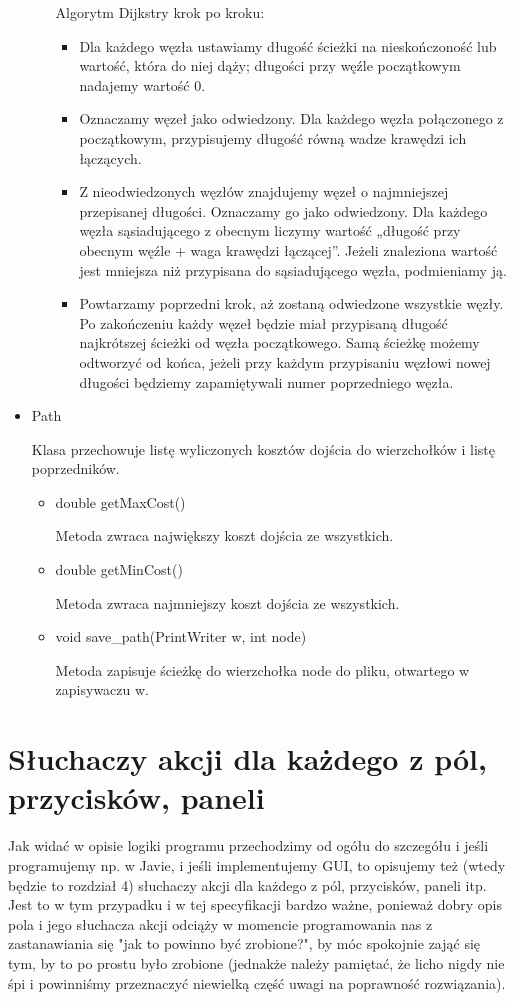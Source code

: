 \documentclass[]{article}
\begin{document}
\begin{itemize}
\begin{itemize}
        Algorytm Dijkstry krok po kroku:
        \begin{itemize}
            \item Dla każdego węzła ustawiamy długość ścieżki na nieskończoność lub wartość, która do niej dąży; długości przy węźle początkowym nadajemy wartość 0. 
            \item Oznaczamy węzeł jako odwiedzony. Dla każdego węzła połączonego z początkowym, przypisujemy długość równą wadze krawędzi ich łączących.
            \item Z nieodwiedzonych węzłów znajdujemy węzeł o najmniejszej przepisanej długości. Oznaczamy go jako odwiedzony. Dla każdego węzła sąsiadującego z obecnym liczymy wartość „długość przy obecnym węźle + waga krawędzi łączącej”. Jeżeli znaleziona wartość jest mniejsza niż przypisana do sąsiadującego węzła, podmieniamy ją.
            \item Powtarzamy poprzedni krok, aż zostaną odwiedzone wszystkie węzły. Po zakończeniu każdy węzeł będzie miał przypisaną długość najkrótszej ścieżki od węzła początkowego. Samą ścieżkę możemy odtworzyć od końca, jeżeli przy każdym przypisaniu węzłowi nowej długości będziemy zapamiętywali numer poprzedniego węzła.
        \end{itemize}
    \end{itemize}
    \item Path
  
    Klasa przechowuje listę wyliczonych kosztów dojścia do wierzchołków i listę poprzedników.
        \begin{itemize}
        \item double getMaxCost()
        
        Metoda zwraca największy koszt dojścia ze wszystkich.
        \item double getMinCost()
        
        Metoda zwraca najmniejszy koszt dojścia ze wszystkich.
        \item void save\_path(PrintWriter w, int node)
        
        Metoda zapisuje ścieżkę do wierzchołka node do pliku, otwartego w zapisywaczu w.
    \end{itemize}
\end{itemize}

\section{Słuchaczy akcji dla każdego z pól, przycisków, paneli}\label{header-n279}
 Jak widać w opisie logiki programu przechodzimy od ogółu do szczegółu i jeśli programujemy np. w Javie, i jeśli implementujemy GUI, to opisujemy też (wtedy będzie to rozdział 4) słuchaczy akcji dla każdego z pól, przycisków, paneli itp. Jest to w tym przypadku i w tej specyfikacji bardzo ważne, ponieważ dobry opis pola i jego słuchacza akcji odciąży w momencie programowania nas z zastanawiania się "jak to powinno być zrobione?", by móc spokojnie zająć się tym, by to po prostu było zrobione (jednakże należy pamiętać, że licho nigdy nie śpi i powinniśmy przeznaczyć niewielką część uwagi na poprawność rozwiązania).
\end{document}
